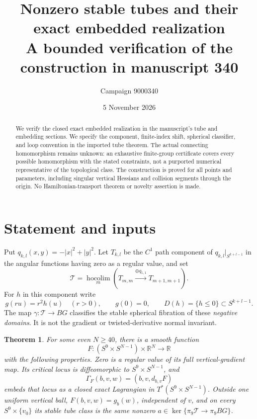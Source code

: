 \documentclass[11pt]{article}
\title{Nonzero stable tubes and their exact embedded realization\\
\large A bounded verification of the construction in manuscript 340}
\author{Campaign 9000340}
\date{5 November 2026}
\newtheorem{theorem}{Theorem}
\theoremstyle{remark}
\newcommand{\R}{\mathbb R}
\newcommand{\T}{\mathcal T}
\begin{document}
\maketitle

\begin{abstract}
We verify the closed exact embedded realization in the manuscript's
tube and embedding sections. We specify the component,
finite-index shift, spherical classifier, and loop convention in the
imported tube theorem. The actual connecting homomorphism remains
unknown: an exhaustive finite-group certificate covers every possible
homomorphism with the stated constraints, not a purported numerical
representative of the topological class. The construction is proved for
all points and parameters, including singular vertical Hessians and
collision segments through the origin. No Hamiltonian-transport theorem
or novelty assertion is made.
\end{abstract}

\section{Statement and inputs}

Put \(q_{k,l}(x,y)=-|x|^2+|y|^2\). Let \(T_{k,l}\) be the \(C^1\)
path component of \(q_{k,l}|_{S^{k+l-1}}\) in the angular functions having
zero as a regular value, and set
\[
 \T=\operatorname*{hocolim}_{m}
       (T_{m,m}\xrightarrow{\oplus q_{1,1}}T_{m+1,m+1}).
\]
For \(h\) in this component write
\[
 g(ru)=r^2h(u)\quad(r>0),\qquad g(0)=0,\qquad
 D(h)=\{h\leq0\}\subset S^{k+l-1}.
\]
The map \(\gamma:\T\to BG\) classifies the stable spherical fibration
of these \emph{negative domains}. It is not the gradient or
twisted-derivative normal invariant.

\begin{theorem}\label{thm:main}
For some even \(N\geq40\), there is a smooth function
\[
 F:(S^9\times S^{N-1})\times\R^N\longrightarrow\R
\]
with the following properties. Zero is a regular value of its full
vertical-gradient map. Its critical locus is diffeomorphic to
\(S^9\times S^{N-1}\), and
\[
 \Gamma_F(b,v,w)=(b,v,d_{b,v}F)
\]
embeds that locus as a closed exact Lagrangian in
\(T^*(S^9\times S^{N-1})\). Outside one uniform vertical ball,
\(F(b,v,w)=g_b(w)\), independent of \(v\), and on every
\(S^9\times\{v_0\}\) its stable tube class is the same nonzero
\(a\in\ker\{\pi_9\T\to\pi_9BG\}\).
\end{theorem}
\end{document}
